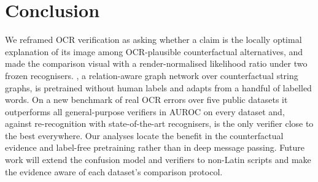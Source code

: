 \section{Conclusion}
\label{sec:conclusion}
We reframed OCR verification as asking whether a claim is the locally optimal explanation of its image among
OCR-plausible counterfactual alternatives, and made the comparison visual with a render-normalised likelihood ratio
under two frozen recognisers. \ours{}, a relation-aware graph network over counterfactual string graphs, is pretrained
without human labels and adapts from a handful of labelled words. On a new benchmark of real OCR errors over five public
datasets it outperforms all general-purpose verifiers in AUROC on every dataset and, against re-recognition with
state-of-the-art recognisers, is the only verifier close to the best everywhere. Our analyses locate the benefit in the counterfactual evidence and
label-free pretraining rather than in deep message passing. Future work will extend the confusion model and verifiers
to non-Latin scripts and make the evidence aware of each dataset's comparison protocol.
